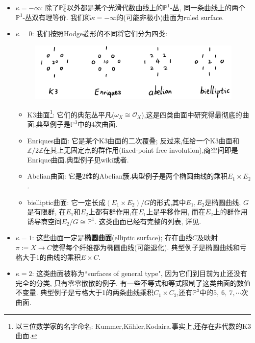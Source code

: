 \documentclass[UTF8,12pt,twoside]{article}
\theoremstyle{definition}
\newcommand{\ZZ}{\mathbb{Z}}  %
\newcommand{\CC}{\mathbb{C}}  %
\newcommand{\PCC}{\mathbb{P}_{\CC}^2} %
\numberwithin{equation}{section}
\begin{document}
\begin{itemize}
	\item $\kappa=-\infty$: 除了$\PCC$以外都是某个光滑代数曲线上的$\mathbb{P}^1$-丛, 同一条曲线上的两个$\mathbb{P}^1$-丛双有理等价. 我们称$\kappa=-\infty$的(可能非极小)曲面为ruled surface.
	\item $\kappa=0$: 我们按照Hodge菱形的不同将它们分为四类: 
	
	\begin{figure}[ht]
		\vspace{0cm}
		\centering
		\includegraphics[width=12cm]{9-7-fig/4algsurf.png}
		\label{fig:4algsurf}
	\end{figure}
	
	
	\begin{itemize}
		\item K3曲面\footnote{以三位数学家的名字命名: Kummer,K\"ahler,Kodaira.事实上,还存在非代数的K3曲面.}: 它们的典范丛平凡($\omega_X \cong \mathcal{O}_X$),这是四类曲面中研究得最彻底的曲面.典型例子是$\mathbb{P}^3$中的4次曲面.%
		\item Enriques曲面: 它是某个K3曲面的二次覆叠;      反过来,任给一个K3曲面和$\ZZ/2\ZZ$在其上无固定点的群作用(fixed-point free involution),商空间即是Enrique曲面.典型例子见wiki或者\cite{beauville1996complex}.
		\item 
		Abelian曲面: 它是2维的Abelian簇.典型例子是两个椭圆曲线的乘积$E_1 \times E_2$.
		\item 
		bielliptic曲面: 它一定长成$(E_1 \times E_2) /G$的形式,其中$E_1,E_2$是椭圆曲线, $G$是有限群, 在$E_1$和$E_2$上都有群作用,在$E_1$上是平移作用, 而在$E_2$上的群作用诱导商空间$E_2/G \cong \mathbb{P}^1$. 这类曲面已经有完整的列表, 详见\cite[List VI.20]{beauville1996complex}.
	\end{itemize}
	\item  $\kappa=1$: 这些曲面一定是\textbf{椭圆曲面}(elliptic surface);      存在曲线$C$及映射$\pi:=X\longrightarrow C$使得每个纤维都为椭圆曲线(可能退化). 典型例子是椭圆曲线和亏格大于1的曲线的乘积$E \times C$.
	\item $\kappa=2$: 这类曲面被称为``surfaces of general type", 因为它们到目前为止还没有完全的分类, 只有零零散散的例子. 有一些不等式和等式限制了这类曲面的数值不变量. 典型例子是亏格大于1的两条曲线乘积$C_1 \times C_2$,还有$\mathbb{P}^3$中的$5,~6,~7,\cdots$次曲面.
\end{itemize}
\end{document}
